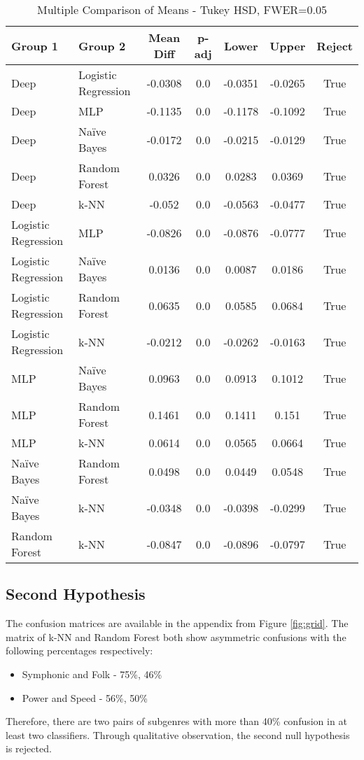 \begin{table}[h!]
\centering
\begin{tabular}{|l|l|c|c|c|c|c|}
\hline
\textbf{Group 1} & \textbf{Group 2} & \textbf{Mean Diff} & \textbf{p-adj} & \textbf{Lower} & \textbf{Upper} & \textbf{Reject} \\ \hline
Deep & Logistic Regression & -0.0308 & 0.0 & -0.0351 & -0.0265 & True \\ \hline
Deep & MLP & -0.1135 & 0.0 & -0.1178 & -0.1092 & True \\ \hline
Deep & Naïve Bayes & -0.0172 & 0.0 & -0.0215 & -0.0129 & True \\ \hline
Deep & Random Forest & 0.0326 & 0.0 & 0.0283 & 0.0369 & True \\ \hline
Deep & k-NN & -0.052 & 0.0 & -0.0563 & -0.0477 & True \\ \hline
Logistic Regression & MLP & -0.0826 & 0.0 & -0.0876 & -0.0777 & True \\ \hline
Logistic Regression & Naïve Bayes & 0.0136 & 0.0 & 0.0087 & 0.0186 & True \\ \hline
Logistic Regression & Random Forest & 0.0635 & 0.0 & 0.0585 & 0.0684 & True \\ \hline
Logistic Regression & k-NN & -0.0212 & 0.0 & -0.0262 & -0.0163 & True \\ \hline
MLP & Naïve Bayes & 0.0963 & 0.0 & 0.0913 & 0.1012 & True \\ \hline
MLP & Random Forest & 0.1461 & 0.0 & 0.1411 & 0.151 & True \\ \hline
MLP & k-NN & 0.0614 & 0.0 & 0.0565 & 0.0664 & True \\ \hline
Naïve Bayes & Random Forest & 0.0498 & 0.0 & 0.0449 & 0.0548 & True \\ \hline
Naïve Bayes & k-NN & -0.0348 & 0.0 & -0.0398 & -0.0299 & True \\ \hline
Random Forest & k-NN & -0.0847 & 0.0 & -0.0896 & -0.0797 & True \\ \hline
\end{tabular}
\caption{Multiple Comparison of Means - Tukey HSD, FWER=0.05}
\label{tab:tukey_hsd_test_results}
\end{table}

\subsection{Second Hypothesis}
The confusion matrices are available in the appendix from Figure \ref{fig:grid}. The matrix of k-NN and Random Forest both show asymmetric confusions with the following percentages respectively:
\begin{itemize}
    \item Symphonic and Folk - 75\%, 46\% 
    \item Power and Speed - 56\%, 50\%
\end{itemize}

Therefore, there are two pairs of subgenres with more than 40\% confusion in at least two classifiers. Through qualitative observation, the second null hypothesis is rejected.
